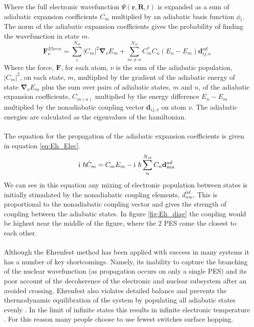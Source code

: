 Where the full electronic wavefunction $\Psi(\mathbf{r}, \mathbf{R}, t)$ is expanded as a sum of adiabatic expansion coefficients $C_{m}$ multiplied by an adiabatic basis function $\phi_i$. The norm of the adiabatic expansion coefficients gives the probability of finding the wavefunction in state $m$.
\begin{equation}
  \mathbf{F}_{\nu}^{Ehren} = \sum_i^{N_{st}} |C_{m}|^2 \mathbf{\nabla}_{\nu} E_{m} + \sum_{m \neq n}^{N_{st}} C_{m}^{*} C_{n} (E_{n} - E_{m}) \mathbf{d}_{ij, \nu}^{ad}
  \label{eq:Eh_Force}
\end{equation}
Where the force, $\mathbf{F}$, for each atom, $\nu$ is the sum of the adiabatic population, $|C_{m}|^2$, on each state, $m$, multiplied by the gradient of the adiabatic energy of state $\mathbf{\nabla}_{\nu}E_{m}$ plus the sum over pairs of adiabatic states, $m$ and $n$, of the adiabatic expansion coefficients, $C_{m (n)}$ multiplied by the energy difference $E_{n} - E_{m}$ multiplied by the nonadiabatic coupling vector $\mathbf{d}_{ij, \nu}$ on atom $\nu$. The adiabatic energies are calculated as the eigenvalues of the hamiltonian.
\\\\
The equation for the propagation of the adiabatic expansion coefficients is given in equation \eqref{eq:Eh_Elec}.
\begin{equation}
  \im \ \hbar \dot{C}_{m} = C_{m}E_{m} -  \im \ \hbar  \sum_{n}^{N_{st}} C_{n} \mathbf{d}^{ad}_{mn}
  \label{eq:Eh_Elec}
\end{equation}
We can see in this equation any mixing of electronic population between states is initially stimulated by the nonadiabatic coupling elements, $d_{nm}^{ad}$. This is proportional to the nonadiabatic coupling vector and gives the strength of coupling between the adiabatic states. In figure \ref{fig:Eh_diag} the coupling would be highest near the middle of the figure, where the 2 PES come the closest to each other.
\\\\
Although the Ehrenfest method has been applied with success in many systems \cite{Li2005Aug, Saita2012Dec, Kohen1998Sep} it has a number of key shortcomings. Namely, its inability to capture the branching of the nuclear wavefunction (as propagation occurs on only a single PES) and its poor account of the decoherence of the electronic and nuclear subsystem after an avoided crossing. Ehrenfest also violates detailed balance and prevents the thermodynamic equilibration of the system by populating all adiabatic states evenly \cite{tully_perspective:_2012, john_c._tully_nonadiabatic_nodate}. In the limit of infinite states this results in infinite electronic temperature \cite{parandekar_detailed_2006}. For this reason many people choose to use fewest switches surface hopping.


